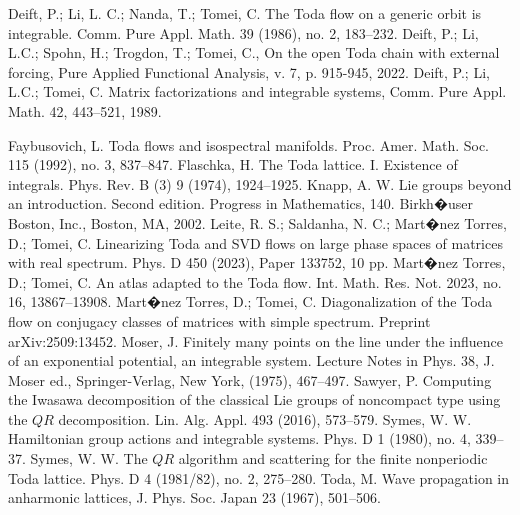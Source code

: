 \documentclass[reqno]{amsart}
\theoremstyle{definition} %
\begin{document}
\begin{thebibliography}{}

 Deift, P.; Li, L. C.; Nanda, T.; Tomei, C. {The Toda flow on a generic orbit is integrable}. Comm. Pure Appl. Math. 39 (1986), no. 2, 183--232.
Deift, P.; Li, L.C.; Spohn, H.; Trogdon, T.; Tomei, C., {
 On the open Toda chain with external forcing}, Pure Applied Functional Analysis, v. 7, p. 915-945, 2022.
 Deift, P.; Li, L.C.;  Tomei, C. { Matrix factorizations and integrable systems}, Comm. Pure Appl. Math. 42, 443--521, 1989.

 Faybusovich, L. Toda flows and isospectral manifolds. Proc. Amer. Math. Soc. 115 (1992), no. 3, 837--847.
 Flaschka, H. The Toda lattice. I. Existence of integrals. Phys. Rev. B (3) 9 (1974), 1924--1925.
 Knapp, A. W. Lie groups beyond an introduction. Second edition. Progress in Mathematics, 140. Birkh�user Boston, Inc., Boston, MA, 2002.
 Leite, R. S.; Saldanha, N. C.; Mart�nez Torres, D.; Tomei, C. Linearizing Toda and SVD flows on large phase spaces of matrices with real spectrum. Phys. D 450 (2023),
 Paper 133752, 10 pp.
 Mart�nez Torres, D.; Tomei, C. An atlas adapted to the Toda flow. Int. Math. Res. Not. 2023, no. 16, 13867--13908.
Mart�nez Torres, D.; Tomei, C. Diagonalization of the Toda flow on conjugacy classes of matrices with simple spectrum. Preprint arXiv:2509:13452.
 Moser, J. Finitely many points on the line under the influence of an exponential potential, an integrable system. Lecture Notes in Phys. 38, J. Moser ed., Springer-Verlag, New York, (1975), 467--497.
 Sawyer, P. Computing the Iwasawa decomposition of the classical Lie groups of noncompact type using the $QR$ decomposition. Lin. Alg. Appl. 493 (2016), 573--579.
 Symes, W. W. Hamiltonian group actions and integrable systems. Phys. D 1 (1980), no. 4, 339--37.
 Symes, W. W. The $QR$ algorithm and scattering for the finite nonperiodic Toda lattice. Phys. D 4 (1981/82), no. 2, 275--280.
  Toda, M. Wave propagation in anharmonic lattices, J. Phys. Soc. Japan 23 (1967), 501--506.
\end{thebibliography}
\end{document}
